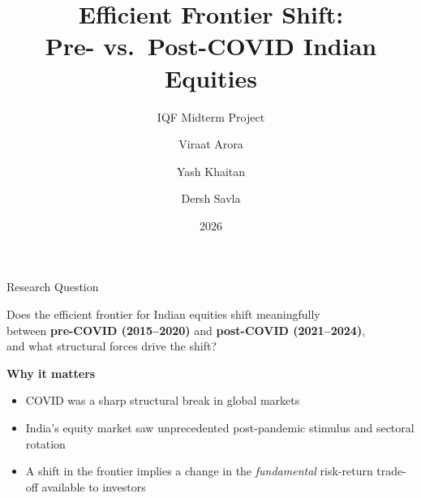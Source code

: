 \documentclass[aspectratio=169]{beamer}
\title{Efficient Frontier Shift:\\Pre- vs.\ Post-COVID Indian Equities}
\subtitle{IQF Midterm Project}
\author{Viraat Arora \and Yash Khaitan \and Dersh Savla}
\date{2026}
\begin{document}
\maketitle

\begin{frame}{Research Question}
  \begin{block}{}
    \centering\large
    Does the efficient frontier for Indian equities shift meaningfully\\
    between \textbf{pre-COVID (2015--2020)} and \textbf{post-COVID (2021--2024)},\\
    and what structural forces drive the shift?
  \end{block}

  \vspace{1em}
  \textbf{Why it matters}
  \begin{itemize}
    \item COVID was a sharp structural break in global markets
    \item India's equity market saw unprecedented post-pandemic stimulus and sectoral rotation
    \item A shift in the frontier implies a change in the \emph{fundamental} risk-return trade-off available to investors
  \end{itemize}
\end{frame}
\end{document}
